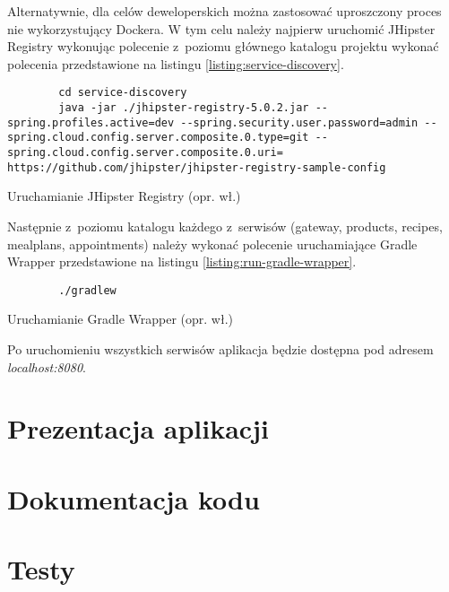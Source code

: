 Alternatywnie, dla celów deweloperskich można zastosować uproszczony proces nie wykorzystujący Dockera.
W tym celu należy najpierw uruchomić JHipster Registry wykonując polecenie z~poziomu głównego katalogu projektu
wykonać polecenia przedstawione na listingu \ref{listing:service-discovery}.
\begin{listing}[h!]
    \begin{verbatim}
        cd service-discovery
        java -jar ./jhipster-registry-5.0.2.jar --spring.profiles.active=dev --spring.security.user.password=admin --spring.cloud.config.server.composite.0.type=git --spring.cloud.config.server.composite.0.uri= https://github.com/jhipster/jhipster-registry-sample-config
    \end{verbatim}
    \caption{Uruchamianie JHipster Registry (opr. wł.)} \label{listing:service-discovery}
\end{listing}

Następnie z~poziomu katalogu każdego z~serwisów (gateway, products, recipes, mealplans, appointments)
należy wykonać polecenie uruchamiające Gradle Wrapper przedstawione na listingu \ref{listing:run-gradle-wrapper}.
\begin{listing}[h!]
    \begin{verbatim}
        ./gradlew
    \end{verbatim}
    \caption{Uruchamianie Gradle Wrapper (opr. wł.)} \label{listing:run-gradle-wrapper}
\end{listing}

Po uruchomieniu wszystkich serwisów aplikacja będzie dostępna pod adresem \textit{localhost:8080}.

\section{Prezentacja aplikacji}\label{sec:app-presentation}

\section{Dokumentacja kodu}\label{sec:code-documentation}
\section{Testy}\label{sec:tests}
\thispagestyle{normal}
